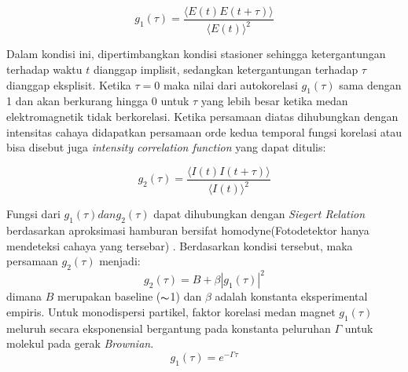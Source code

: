 \begin{equation}
    g_1 (\tau) = \frac{\langle E(t) E(t+\tau)\rangle}{\langle E(t)\rangle^2}
\end{equation}

Dalam kondisi ini, dipertimbangkan kondisi stasioner sehingga ketergantungan terhadap waktu
${t}$ dianggap implisit, sedangkan ketergantungan terhadap ${\tau}$ dianggap eksplisit.
Ketika ${\tau = 0}$ maka nilai dari autokorelasi ${g_1(\tau)}$ sama dengan 1 dan akan
berkurang hingga 0 untuk ${\tau}$ yang lebih besar ketika medan elektromagnetik tidak
berkorelasi. Ketika persamaan diatas dihubungkan dengan intensitas cahaya didapatkan
persamaan orde kedua temporal fungsi korelasi atau bisa disebut juga \textit{intensity
correlation function} yang dapat ditulis:

\begin{equation}
    g_2 (\tau) = \frac{\langle I(t) I(t+\tau)\rangle}{\langle I(t)\rangle^2}
\end{equation}


Fungsi dari ${g_1(\tau) dan g_2(\tau)}$ dapat dihubungkan dengan \textit{Siegert Relation}
berdasarkan aproksimasi hamburan bersifat homodyne(Fotodetektor hanya mendeteksi cahaya
yang tersebar) \cite{Stetefeld2016}. Berdasarkan kondisi tersebut, maka persamaan
${g_2(\tau)}$ menjadi:
\begin{equation}
    g_2(\tau) = B + \beta|g_1(\tau)|^2
\end{equation}
\noindent
dimana ${B}$ merupakan baseline (${\thicksim}$1) dan ${\beta}$ adalah konstanta eksperimental empiris.
Untuk monodispersi partikel, faktor korelasi medan magnet ${g_1(\tau)}$ meluruh secara
eksponensial bergantung pada konstanta peluruhan ${\Gamma}$ untuk molekul pada gerak
\textit{Brownian}.
\begin{equation}
    g_1(\tau)=e^{-\Gamma \tau}
    \label{eq:g1tau}
\end{equation}

